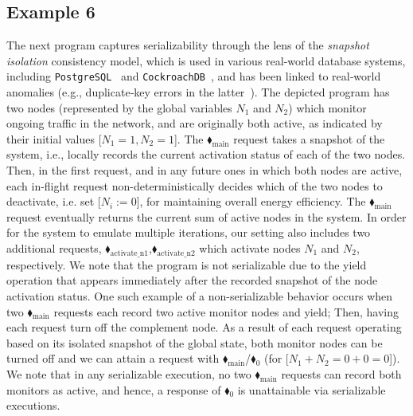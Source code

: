 \subsection{Example 6}


The next program captures serializability through the lens of the \textit{snapshot isolation} consistency model, which is used in various real-world database systems, including \texttt{PostgreSQL}~\cite{postgresql-transaction-iso} and \texttt{CockroachDB}~\cite{cockroachdb-si-docs}, and has been linked to real‐world anomalies (e.g., duplicate‐key errors in the latter~\cite{cockroach-issue-14099}).
%
The depicted program has two nodes (represented by the global variables $N_1$ and $N_2$) which monitor ongoing traffic in the network, and are originally both active, as indicated by their initial values [$N_1=1,N_2=1$].
%
The {\color{ForestGreen}$\blacklozenge_\text{main}$} request takes a snapshot of the system, i.e., locally records the current activation status of each of the two nodes.
%
Then, in the first request, and in any future ones in which both nodes are active, each in-flight request non-deterministically decides which of the two nodes to deactivate, i.e. set [$N_i:=0$], for maintaining overall energy efficiency.
%
The {\color{ForestGreen}$\blacklozenge_\text{main}$} request eventually returns the current sum of active nodes in the system.
%
In order for the system to emulate multiple iterations, our setting also includes two additional requests, {\color{ForestGreen}$\blacklozenge_\text{activate\_n1}$},{\color{ForestGreen}$\blacklozenge_\text{activate\_n2}$} which activate nodes $N_1$ and $N_2$, respectively.
%
We note that the program is not serializable due to the yield operation that appears immediately after the recorded snapshot of the node activation status. One such example of a non-serializable behavior occurs when two {\color{ForestGreen}$\blacklozenge_\text{main}$} requests each record two active monitor nodes and yield; Then, having each request turn off the complement node. As a result of each request operating based on its isolated snapshot of the global state, both monitor nodes can be turned off and we can attain a request with {\color{ForestGreen}$\blacklozenge_\text{main}$}/{\color{red}$\blacklozenge_0$} (for [$N_1+N_2=0+0=0$]).
%
We note that in any serializable execution, no two {\color{ForestGreen}$\blacklozenge_\text{main}$} requests can record both monitors as active, and hence, a response of {\color{red}$\blacklozenge_0$} is unattainable via serializable executions.




